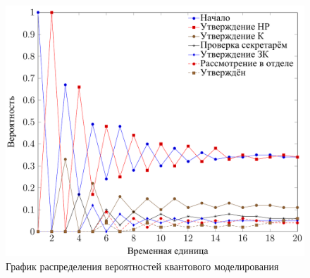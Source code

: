\begin{figure}[h!]
	\centering
	\includegraphics[width=\textwidth]{inc/graph.png}
	\caption{График распределения вероятностей квантового моделирования}
	\label{plt:time}
\end{figure}


